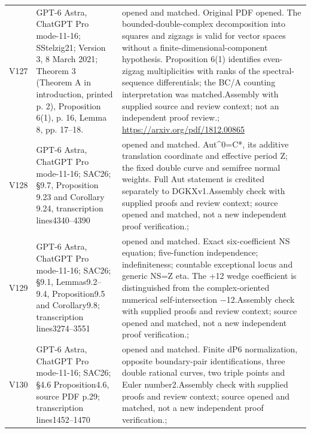 \documentclass[11pt,a4paper]{article}
\theoremstyle{plain}
\theoremstyle{definition}
\begin{document}
\begin{longtable}{@{}L{.08\linewidth}L{.31\linewidth}L{.56\linewidth}@{}}
V127 & GPT-6 Astra, ChatGPT Pro mode-11-16; S\newline Stelzig21; Version 3, 8 March 2021; Theorem 3 (Theorem A in introduction, printed p. 2), Proposition 6(1), p. 16, Lemma 8, pp. 17--18. & opened and matched. Original PDF opened. The bounded-double-complex decomposition into squares and zigzags is valid for vector spaces without a finite-dimensional-component hypothesis. Proposition 6(1) identifies even-zigzag multiplicities with ranks of the spectral-sequence differentials; the BC/\allowbreak{}A counting interpretation was matched.\newline Assembly with supplied source and review context; not an independent proof review.\newline {}; \url{https://arxiv.org/pdf/1812.00865}\\
V128 & GPT-6 Astra, ChatGPT Pro mode-11-16; S\newline AC26; §9.7, Proposition 9.23 and Corollary 9.24, transcription lines4340--4390 & opened and matched. Aut\textasciicircum{}0=C*, its additive translation coordinate and effective period Z; the fixed double curve and semifree normal weights. Full Aut statement is credited separately to DGKXv1.\newline Assembly check with supplied proofs and review context; source opened and matched, not a new independent proof verification.\newline {}; \\
V129 & GPT-6 Astra, ChatGPT Pro mode-11-16; S\newline AC26; §9.1, Lemmas9.2--9.4, Proposition9.5 and Corollary9.8; transcription lines3274--3551 & opened and matched. Exact six-coefficient NS equation; five-function independence; indefiniteness; countable exceptional locus and generic NS=Z eta. The +12 wedge coefficient is distinguished from the complex-oriented numerical self-intersection −12.\newline Assembly check with supplied proofs and review context; source opened and matched, not a new independent proof verification.\newline {}; \\
V130 & GPT-6 Astra, ChatGPT Pro mode-11-16; S\newline AC26; §4.6 Proposition4.6, source PDF p.29; transcription lines1452--1470 & opened and matched. Finite dP6 normalization, opposite boundary-pair identifications, three double rational curves, two triple points and Euler number2.\newline Assembly check with supplied proofs and review context; source opened and matched, not a new independent proof verification.\newline {}; \\

\end{longtable}
\end{document}
